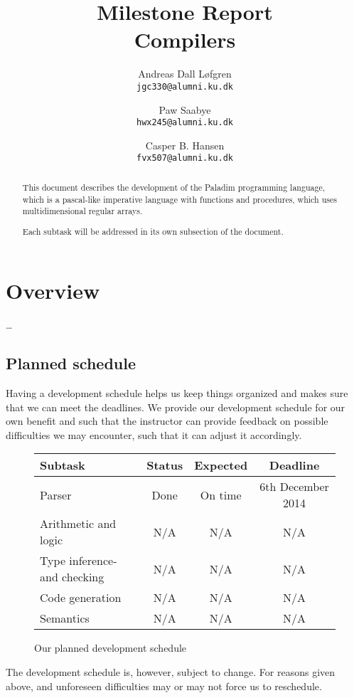 \documentclass[11pt]{article}
\title%
{%
	{\large Milestone Report}\\
	Compilers
}
\author%
{%
	Andreas Dall Løfgren\\
	{\tt jgc330@alumni.ku.dk}
	\and
	Paw Saabye\\
	{\tt hwx245@alumni.ku.dk}
	\and
	Casper B. Hansen\\
	{\tt fvx507@alumni.ku.dk}
}
\begin{document}
\clearpage
\maketitle
\thispagestyle{empty}
\begin{multicols}{2}
\begin{abstract}
This document describes the development of the Paladim programming language,
which is a pascal-like imperative language with functions and procedures, which
uses multidimensional regular arrays.

Each subtask will be addressed in its own subsection of the document.
\end{abstract}
\vfill
\columnbreak%
\tableofcontents
\end{multicols}

\clearpage
\section{Overview}
\ldots

\subsection{Planned schedule}
Having a development schedule helps us keep things organized and makes sure
that we can meet the deadlines. We provide our development schedule for our
own benefit and such that the instructor can provide feedback on possible
difficulties we may encounter, such that it can adjust it accordingly.
\begin{figure}[H]
	\centering
	\begin{tabular}{|l|c|c|c|}
		\hline
		{\bf Subtask} & {\bf Status} & {\bf Expected} & {\bf Deadline} \\ \hline
		Parser & Done & On time & 6th December 2014 \\ \hline
		Arithmetic and logic & N/A & N/A & N/A \\ \hline
		Type inference- and checking & N/A & N/A & N/A \\ \hline
		Code generation & N/A & N/A & N/A \\ \hline
		Semantics & N/A & N/A & N/A \\ \hline
	\end{tabular}
	\label{table:schedule}
	\caption{Our planned development schedule}
\end{figure}
The development schedule is, however, subject to change. For reasons given
above, and unforeseen difficulties may or may not force us to reschedule.
\end{document}
